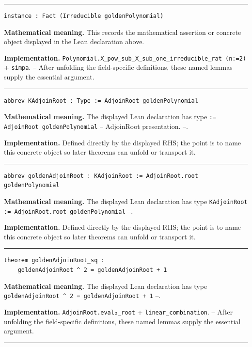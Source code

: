 \documentclass[UTF8,a4paper,11pt,fontset=fandol]{ctexart}
\theoremstyle{definition}
\newcommand{\statementsep}{\par\medskip\hrule\medskip}
\begin{document}
\statementsep
\begin{verbatim}
instance : Fact (Irreducible goldenPolynomial)
\end{verbatim}
\noindent\textbf{Mathematical meaning.} This records the mathematical assertion or concrete object displayed in the Lean declaration above.\par
\noindent\textbf{Implementation.} \texttt{Polynomial.\allowbreak{}X\_\allowbreak{}pow\_\allowbreak{}sub\_\allowbreak{}X\_\allowbreak{}sub\_\allowbreak{}one\_\allowbreak{}irreducible\_\allowbreak{}rat (n:=2)} + \texttt{simpa}. -- After unfolding the field-specific definitions, these named lemmas supply the essential argument.\par
\statementsep
\begin{verbatim}
abbrev KAdjoinRoot : Type := AdjoinRoot goldenPolynomial
\end{verbatim}
\noindent\textbf{Mathematical meaning.} The displayed Lean declaration has type \texttt{:= AdjoinRoot goldenPolynomial} -- AdjoinRoot presentation. --.\par
\noindent\textbf{Implementation.} Defined directly by the displayed RHS; the point is to name this concrete object so later theorems can unfold or transport it.\par
\statementsep
\begin{verbatim}
abbrev goldenAdjoinRoot : KAdjoinRoot := AdjoinRoot.root goldenPolynomial
\end{verbatim}
\noindent\textbf{Mathematical meaning.} The displayed Lean declaration has type \texttt{KAdjoinRoot := AdjoinRoot.\allowbreak{}root goldenPolynomial} --.\par
\noindent\textbf{Implementation.} Defined directly by the displayed RHS; the point is to name this concrete object so later theorems can unfold or transport it.\par
\statementsep
\begin{verbatim}
theorem goldenAdjoinRoot_sq :
    goldenAdjoinRoot ^ 2 = goldenAdjoinRoot + 1
\end{verbatim}
\noindent\textbf{Mathematical meaning.} The displayed Lean declaration has type \texttt{goldenAdjoinRoot \textasciicircum{} 2 = goldenAdjoinRoot + 1} --.\par
\noindent\textbf{Implementation.} \texttt{AdjoinRoot.\allowbreak{}eval₂\_\allowbreak{}root} + \texttt{linear\_\allowbreak{}combination}. -- After unfolding the field-specific definitions, these named lemmas supply the essential argument.\par
\statementsep
\end{document}
